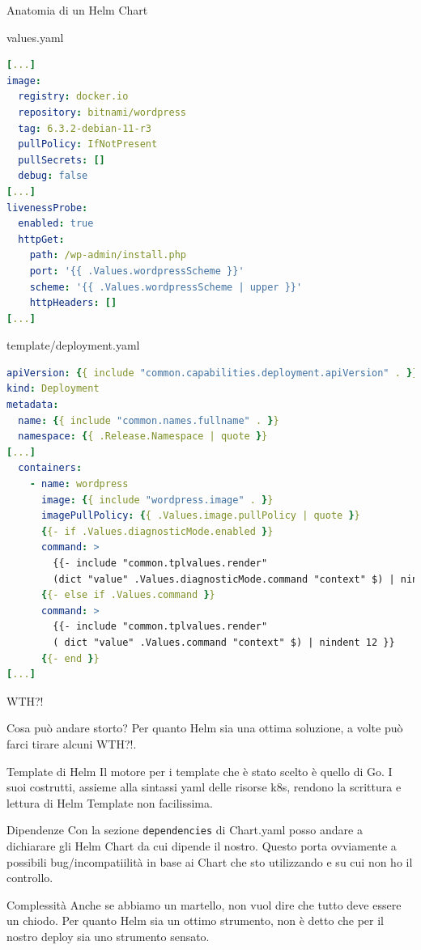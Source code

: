 \documentclass{beamer}
\begin{document}
\begin{frame}{Anatomia di un Helm Chart}
\begin{block}{values.yaml}
\begin{lstlisting}[backgroundcolor=\color{white},language=yaml,basicstyle=\tiny]
[...]
image:
  registry: docker.io
  repository: bitnami/wordpress
  tag: 6.3.2-debian-11-r3
  pullPolicy: IfNotPresent
  pullSecrets: []
  debug: false
[...]
livenessProbe:
  enabled: true
  httpGet:
    path: /wp-admin/install.php
    port: '{{ .Values.wordpressScheme }}'
    scheme: '{{ .Values.wordpressScheme | upper }}'
    httpHeaders: []
[...]
  \end{lstlisting}
  \end{block}
 \framebreak
 \begin{block}{template/deployment.yaml}
 \begin{lstlisting}[backgroundcolor=\color{white},language=yaml,basicstyle=\tiny]
apiVersion: {{ include "common.capabilities.deployment.apiVersion" . }}
kind: Deployment
metadata:
  name: {{ include "common.names.fullname" . }}
  namespace: {{ .Release.Namespace | quote }}
[...]
  containers:
    - name: wordpress
      image: {{ include "wordpress.image" . }}
      imagePullPolicy: {{ .Values.image.pullPolicy | quote }}
      {{- if .Values.diagnosticMode.enabled }}
      command: >
        {{- include "common.tplvalues.render" 
        (dict "value" .Values.diagnosticMode.command "context" $) | nindent 12 }}
      {{- else if .Values.command }}
      command: >
        {{- include "common.tplvalues.render" 
        ( dict "value" .Values.command "context" $) | nindent 12 }}
      {{- end }}
[...]
\end{lstlisting}
\end{block}
\end{frame} 
\begin{frame}{WTH?!}
\begin{block}{Cosa può andare storto?}
Per quanto Helm sia una ottima soluzione, a volte può farci tirare alcuni  WTH?!.
\end{block}
\framebreak
\begin{block}{Template di Helm}
 Il motore per i template che è stato scelto è quello di Go. \newline
 I suoi costrutti, assieme alla sintassi yaml delle risorse k8s, rendono la scrittura e lettura di Helm Template non facilissima.  
\end{block}
\framebreak
\begin{block}{Dipendenze}
Con la sezione \lstinline{dependencies} di Chart.yaml posso andare a dichiarare gli Helm Chart da cui dipende il nostro. \newline 
Questo porta ovviamente a possibili bug/incompatiilità in base ai Chart che sto utilizzando e su cui non ho il controllo.
\end{block}
\framebreak
\begin{block}{Complessità}
Anche se abbiamo un martello, non vuol dire che tutto deve essere un chiodo. \newline Per quanto Helm sia un ottimo strumento, non è detto che per il nostro deploy sia uno strumento sensato.
\end{block}
\end{frame}
\end{document}

